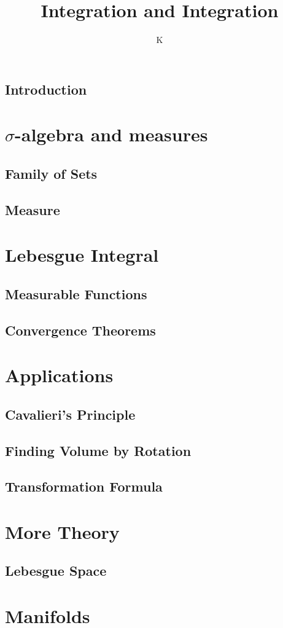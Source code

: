 \documentclass[a4paper]{book}
\title{Integration and Integration}
\author{K}
\theoremstyle{definition}
\begin{document}
\maketitle
\tableofcontents
%
%
%
%
%
\chapter*{Introduction}

%
%
%
%
%
\part{\(\sigma\)-algebra and measures}
%
\chapter{Family of Sets}

%
\chapter{Measure}

%
%
%
%
%
\part{Lebesgue Integral}
\chapter{Measurable Functions}

\chapter{Convergence Theorems}

%
%
%
%
%
\part{Applications}
\chapter{Cavalieri's Principle}

%
\chapter{Finding Volume by Rotation}

%
\chapter{Transformation Formula}

%
%
%
%
%
\part{More Theory}
\chapter{Lebesgue Space}

%
%
%
%
%
\part{Manifolds}

\end{document}
